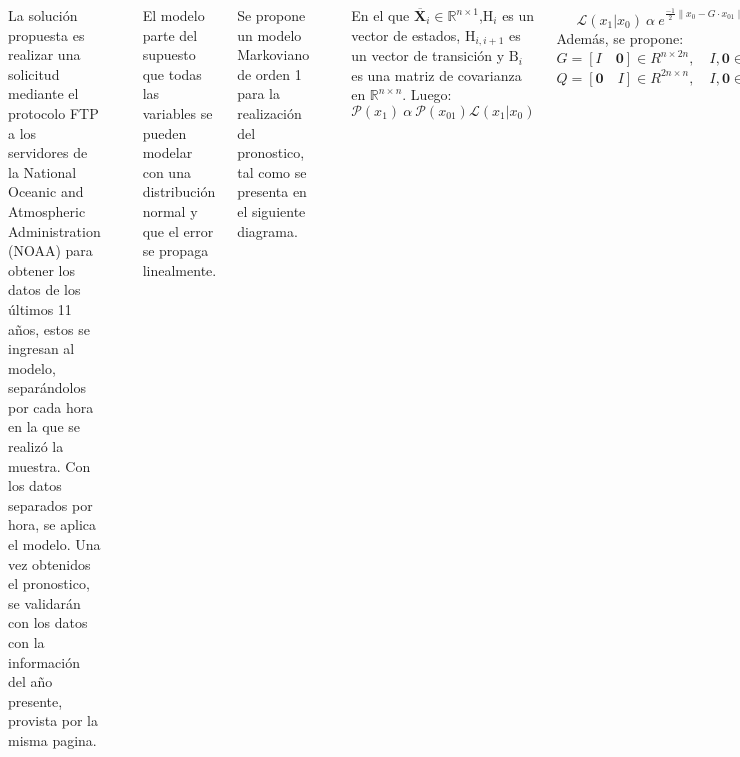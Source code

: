 \documentclass[25pt, portrait]{tikzposter}
\newcommand*\mean[1]{\overline{#1}}
\begin{document}
\begin{columns}
    {
        La solución propuesta es realizar una solicitud mediante el protocolo FTP a los servidores de la National Oceanic and Atmospheric Administration (NOAA) para obtener los datos de los últimos 11 años, estos se ingresan al modelo, separándolos por cada hora en la que se realizó la muestra. Con los datos separados por hora, se aplica el modelo. Una vez obtenidos el pronostico, se validarán con los datos con la información del año presente, provista por la misma pagina.
        \begin{tikzfigure}
            \includegraphics[width=0.4\textwidth]{images/diagram.png}
        \end{tikzfigure}
        El modelo parte del supuesto que todas las variables se pueden modelar con una distribución normal y que el error se propaga linealmente.
    }
    {
        Se propone un modelo Markoviano de orden 1 para la realización del pronostico, tal como se presenta en el siguiente diagrama. 
        \begin{tikzfigure}
            \includegraphics[width=0.4\textwidth]{images/Markovian.png}
        \end{tikzfigure}
        
        En el que $\mean{\mathbf{X}}_i \in \mathbb{R}^{n \times 1}$,$\mbox{H}_i$  es un vector de estados, $\mbox{H}_{i,i+1}$ es un vector de transición y $\mbox{B}_i$ es una matriz de covarianza en $\mathbb{R}^{n \times n}$. Luego:
        \begin{equation*} \label{eu_eqn}
            \mathcal P(x_{1}) \: \alpha \: \mathcal P(x_{01})\mathscr{L}(x_1|x_0)
        \end{equation*}
    
        \begin{equation*} 
            \mathscr{L}(x_1|x_0) \: \alpha \: {e}^{\frac{-1}{2}{\lVert x_0-G\cdot{x}_{01} \rVert}^2_{B_0^-1}}
        \end{equation*}
         Además, se propone: \\
         $G=[I \quad \boldsymbol{0}]  \in {R}^{n \times 2n}, \quad I,\boldsymbol{0} \in \mathbb{R}^{n \times n}$\\
        $Q=[\boldsymbol{0} \quad I]  \in {R}^{2n \times n}, \quad I,\boldsymbol{0} \in \mathbb{R}^{n \times n}$
    }
\end{columns}
\end{document}

